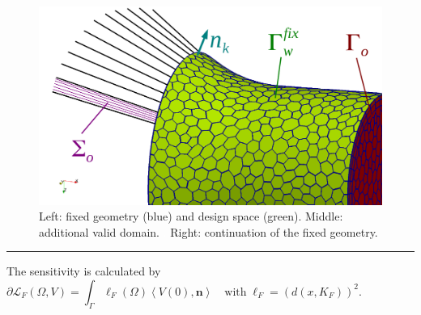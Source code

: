 \documentclass[8pt]{beamer}
\newcommand{\Om }{ \Omega}
\newcommand{\LL }{ \mathcal{L}}
\newcommand{\bnn}{\boldsymbol{n}}
\begin{document}
{\begin{figure}[h]
\begin{minipage}[b]{3.5 cm}
  \end{minipage} 
  \begin{minipage}[b]{3 cm}
    \includegraphics[scale=0.2]{strahlfl.png}  
  \end{minipage} 
  \caption{Left: fixed geometry (blue) and design space (green). 
  Middle: additional valid domain.
  \newline \textcolor{white}{.} \qquad \quad \; Right: continuation of the fixed geometry.}
\label{strahlfl0}
\end{figure}
\noindent\rule{11cm}{0.4pt}
The sensitivity is calculated by
\begin{equation*}
\partial \LL_F\left(\Om,V\right)=\int_\Gamma \ell_F \left(\Om\right) \left\langle V\left(0\right),\bnn\right\rangle
\quad \mbox{with} \; \ell_F=(d(x,K_F))^2.\qquad \qquad \qquad \qquad 
\end{equation*}
}
%
%
\end{document}
